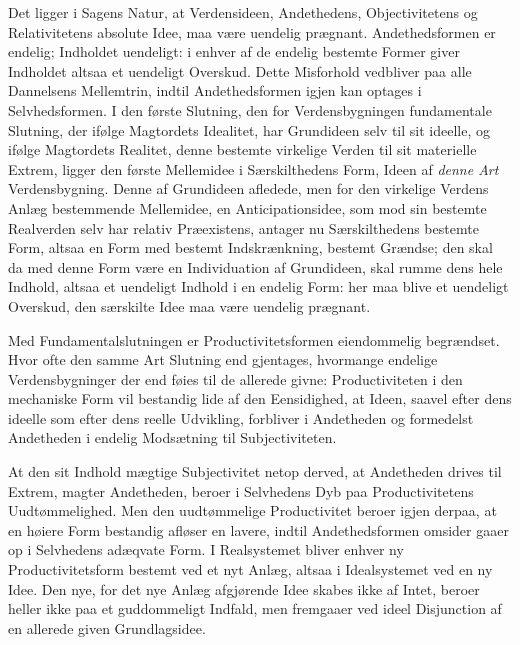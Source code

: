 \documentclass[12pt]{book}
\newcommand{\opage}[1]{\marginnote{\footnotesize\textit{[#1]}}}
\begin{document}
Det ligger i Sagens Natur, at Verdensideen, Andethedens, Objectivitetens og Relativitetens absolute Idee, maa være uendelig prægnant. Andethedsformen er endelig; Indholdet uendeligt: i enhver af de endelig bestemte Former giver Indholdet altsaa et uendeligt Overskud. Dette Misforhold vedbliver paa alle Dannelsens Mellemtrin, indtil Andethedsformen igjen kan optages i Selvhedsformen. I den første Slutning, den for Verdensbygningen fundamentale Slutning, der ifølge Magtordets Idealitet, har Grundideen selv til sit ideelle, og ifølge Magtordets Realitet, denne bestemte virkelige Verden til sit materielle Extrem, ligger den første Mellemidee i Særskilthedens Form, Ideen af \emph{denne Art} Verdensbygning. Denne af Grundideen afledede, men for den virkelige Verdens Anlæg bestemmende Mellemidee, en Anticipationsidee, som mod sin bestemte Realverden selv har relativ Præexistens, antager nu Særskilthedens bestemte Form, altsaa en Form med bestemt Indskrænkning, bestemt Grændse; den skal da med denne
\opage{447}Form være en Individuation af Grundideen, skal rumme dens hele Indhold, altsaa et uendeligt Indhold i en endelig Form: her maa blive et uendeligt Overskud, den særskilte Idee maa være uendelig prægnant.

Med Fundamentalslutningen er Productivitetsformen eiendommelig begrændset. Hvor ofte den samme Art Slutning end gjentages, hvormange endelige Verdensbygninger der end føies til de allerede givne: Productiviteten i den mechaniske Form vil bestandig lide af den Eensidighed, at Ideen, saavel efter dens ideelle som efter dens reelle Udvikling, forbliver i Andetheden og formedelst Andetheden i endelig Modsætning til Subjectiviteten.

At den sit Indhold mægtige Subjectivitet netop derved, at Andetheden drives til Extrem, magter Andetheden, beroer i Selvhedens Dyb paa Productivitetens Uudtømmelighed. Men den uudtømmelige Productivitet beroer igjen derpaa, at en høiere Form bestandig afløser en lavere, indtil Andethedsformen omsider gaaer op i Selvhedens adæqvate Form. I Realsystemet bliver enhver ny Productivitetsform bestemt ved et nyt Anlæg, altsaa i Idealsystemet ved en ny Idee. Den nye, for det nye Anlæg afgjørende Idee skabes ikke af Intet, beroer heller ikke paa et guddommeligt Indfald, men fremgaaer ved ideel Disjunction af en allerede given Grundlagsidee.
\end{document}
